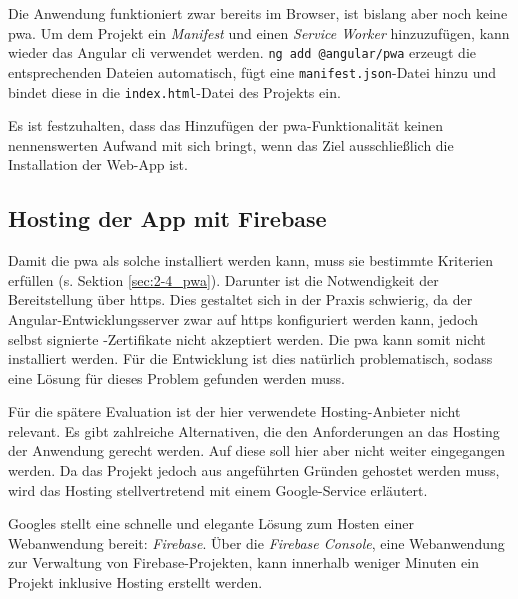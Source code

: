 Die Anwendung funktioniert zwar bereits im Browser, ist bislang aber noch keine \ac{pwa}. Um dem Projekt ein \textit{Manifest} und einen \textit{Service Worker} hinzuzufügen, kann wieder das Angular \ac{cli} verwendet werden. \texttt{ng add @angular/pwa} erzeugt die entsprechenden Dateien automatisch, fügt eine \texttt{manifest.json}-Datei hinzu und bindet diese in die \texttt{index.html}-Datei des Projekts ein.

Es ist festzuhalten, dass das Hinzufügen der \ac{pwa}-Funktionalität keinen nennenswerten Aufwand mit sich bringt, wenn das Ziel ausschließlich die Installation der Web-App ist.

\subsection{Hosting der App mit Firebase}
Damit die \ac{pwa} als solche installiert werden kann, muss sie bestimmte Kriterien erfüllen (s. Sektion \ref{sec:2-4_pwa}). Darunter ist die Notwendigkeit der Bereitstellung über \ac{https}. Dies gestaltet sich in der Praxis schwierig, da der Angular-Entwicklungsserver zwar auf \ac{https} konfiguriert werden kann, jedoch selbst signierte -Zertifikate nicht akzeptiert werden. Die \ac{pwa} kann somit nicht installiert werden. Für die Entwicklung ist dies natürlich problematisch, sodass eine Lösung für dieses Problem gefunden werden muss.

Für die spätere Evaluation ist der hier verwendete Hosting-Anbieter nicht relevant. Es gibt zahlreiche Alternativen, die den Anforderungen an das Hosting der Anwendung gerecht werden. Auf diese soll hier aber nicht weiter eingegangen werden. Da das Projekt jedoch aus angeführten Gründen gehostet werden muss, wird das Hosting stellvertretend mit einem Google-Service erläutert.

Googles stellt eine schnelle und elegante Lösung zum Hosten einer Webanwendung bereit: \textit{Firebase}. Über die \textit{Firebase Console}, eine Webanwendung zur Verwaltung von Firebase-Projekten, kann innerhalb weniger Minuten ein Projekt inklusive Hosting erstellt werden. 

